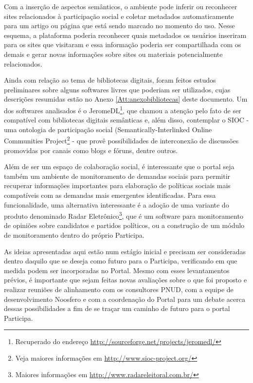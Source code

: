Com a inserção de aspectos semânticos, o ambiente pode inferir ou reconhecer sites relacionados à participação social e coletar metadados automaticamente para um artigo ou página que está sendo marcado no momento do uso. Nesse esquema, a plataforma poderia reconhecer quais metadados os usuários inseriram para os sites que visitaram e essa informação poderia ser compartilhada com os demais e gerar novas informações sobre sites ou materiais potencialmente relacionados.

Ainda com relação ao tema de bibliotecas digitais, foram feitos estudos preliminares sobre alguns softwares livres que poderiam ser utilizados, cujas descrições resumidas estão no Anexo \ref{Att:anexobibliotecas} deste documento. Um dos softwares analisados é o JeromeDL\footnote{Recuperado do endereço \url{http://sourceforge.net/projects/jeromedl/}}, que chamou a atenção pelo fato de ser compatível com bibliotecas digitais semânticas e, além disso, contemplar o SIOC - uma ontologia de participação social (Semantically-Interlinked Online Communities Project\footnote{Veja maiores informações em \url{http://www.sioc-project.org/}} - que provê possibilidades de interconexão de discussões promovidas por canais como blogs e fóruns, dentre outros.

Além de ser um espaço de colaboração social, é interessante que o portal seja também um ambiente de monitoramento de demandas sociais para permitir recuperar informações importantes para elaboração de políticas sociais mais compatíveis com as demandas mais emergentes identificadas. Para essa funcionalidade, uma alternativa interessante é a adoção de uma variante do produto denominado Radar Eletrônico\footnote{Maiores informações em \url{http://www.radareleitoral.com.br/}}, que é um software para monitoramento de opiniões sobre candidatos e partidos políticos, ou a construção de um módulo de monitoramento dentro do próprio Participa.

As ideias apresentadas aqui estão num estágio inicial e precisam ser consideradas dentro daquilo que se deseja como futuro para o Participa, verificando em que medida podem ser incorporadas no Portal. Mesmo com esses levantamentos prévios, é importante que sejam feitas novas avaliações sobre o que foi proposto e realizar reuniões de alinhamento com os consultores PNUD, com a equipe de desenvolvimento Noosfero e com a coordenação do Portal para um debate acerca dessas possibilidades a fim de se traçar um caminho de futuro para o portal Participa.
